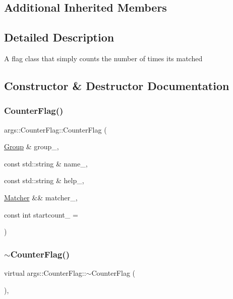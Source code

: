 \subsection*{Additional Inherited Members}


\subsection{Detailed Description}
A flag class that simply counts the number of times it\textquotesingle{}s matched 

\subsection{Constructor \& Destructor Documentation}
\mbox{\label{classargs_1_1_counter_flag_a804bc02152fef801581c150e4271089a}} 
\subsubsection{\texorpdfstring{Counter\+Flag()}{CounterFlag()}}
{\footnotesize\ttfamily args\+::\+Counter\+Flag\+::\+Counter\+Flag (\begin{DoxyParamCaption}\item[{\hyperlink{classargs_1_1_group}{Group} \&}]{group\+\_\+,  }\item[{const std\+::string \&}]{name\+\_\+,  }\item[{const std\+::string \&}]{help\+\_\+,  }\item[{\hyperlink{classargs_1_1_matcher}{Matcher} \&\&}]{matcher\+\_\+,  }\item[{const int}]{startcount\+\_\+ = {} }\end{DoxyParamCaption})\hspace{0.3cm}{\ttfamily [inline]}}

\mbox{\label{classargs_1_1_counter_flag_a3acc256cd4819c320800c57565d7c2e3}} 
\subsubsection{\texorpdfstring{$\sim$\+Counter\+Flag()}{~CounterFlag()}}
{\footnotesize\ttfamily virtual args\+::\+Counter\+Flag\+::$\sim$\+Counter\+Flag (\begin{DoxyParamCaption}{ }\end{DoxyParamCaption})\hspace{0.3cm}{\ttfamily [inline]}, {\ttfamily [virtual]}}



